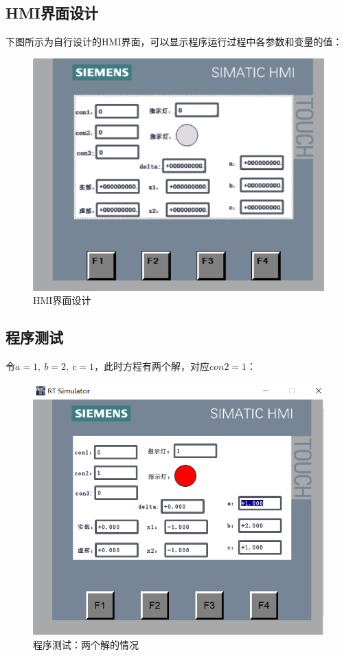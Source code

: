 \documentclass[UTF8]{article}
\begin{document}
\subsection{HMI界面设计}
下图所示为自行设计的HMI界面，可以显示程序运行过程中各参数和变量的值：
\begin{figure}[H]
    \centering %
    \includegraphics[width=.8\textwidth]{figure/HMI界面设计.png} 
    \caption{HMI界面设计} %
\end{figure}

\subsection{程序测试}
令$a = 1,\ b = 2,\ c = 1$，此时方程有两个解，对应$con2 = 1$：
\begin{figure}[H]
    \centering %
    \includegraphics[width=.8\textwidth]{figure/相同解.png} 
    \caption{程序测试：两个解的情况} %
\end{figure}
\end{document}

